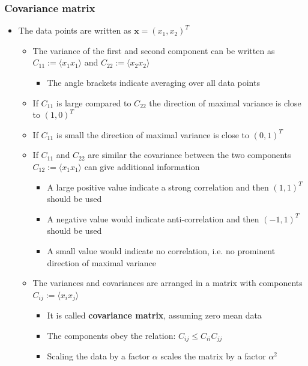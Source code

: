 \documentclass[11pt]{article}
\begin{document}
\subsubsection{Covariance matrix}
\label{sec:org6559029}
\begin{itemize}
\item The data points are written as \(\pmb x = (x_1, x_2)^T\)
\begin{itemize}
\item The variance of the first and second component can be written as \(C_{11} := \langle x_1x_1 \rangle\) and \(C_{22} := \langle x_2x_2 \rangle\)
\begin{itemize}
\item The angle brackets indicate averaging over all data points
\end{itemize}
\item If \(C_{11}\) is large compared to \(C_{22}\) the direction of maximal variance is close to \((1,0)^T\)
\item If \(C_{11}\) is small the direction of maximal variance is close to \((0,1)^T\)
\item If \(C_{11}\) and \(C_{22}\) are similar the covariance between the two components \(C_{12} := \langle x_1x_1 \rangle\) can give additional information
\begin{itemize}
\item A large positive value indicate a strong correlation and then \((1,1)^T\) should be used
\item A negative value would indicate anti-correlation and then \((-1,1)^T\) should be used
\item A small value would indicate no correlation, i.e. no prominent direction of maximal variance
\end{itemize}
\item The variances and covariances are arranged in a matrix with components \(C_{ij} := \langle x_ix_j \rangle\)
\begin{itemize}
\item It is called \textbf{covariance matrix}, assuming zero mean data
\item The components obey the relation: \(C_{ij} \leq C_{ii} C_{jj}\)
\item Scaling the data by a factor \(\alpha\) scales the matrix by a factor \(\alpha^2\)
\end{itemize}
\end{itemize}
\end{itemize}
\end{document}
